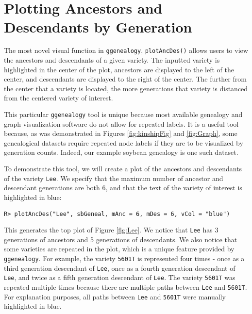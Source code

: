 \documentclass[11pt,a4paper,oldfontcommands,openany]{memoir}
\DeclareRobustCommand{\mybox}[2][gray!15]{%
\begin{tcolorbox}[   %
        breakable,
        left=0pt,
        right=0pt,
        top=0pt,
        bottom=0pt,
        colback=#1,
        colframe=#1,
        width=\dimexpr\textwidth\relax, 
        enlarge left by=0mm,
        boxsep=5pt,
        arc=0pt,outer arc=0pt,
        ]
        #2
\end{tcolorbox}
}
\numberwithin{equation}{section} %
\newcommand{\code}[1]{{\texttt{#1}}}
\newcommand{\pkg}[1]{{\texttt{#1}}}
\begin{document}
\section{Plotting Ancestors and Descendants by Generation}
\label{remedy}

The most novel visual function in \pkg{ggenealogy}, \code{plotAncDes()} allows users to view the ancestors and descendants of a given variety. The inputted variety is highlighted in the center of the plot, ancestors are displayed to the left of the center, and descendants are displayed to the right of the center. The further from the center that a variety is located, the more generations that variety is distanced from the centered variety of interest.

This particular \pkg{ggenealogy} tool is unique because most available genealogy and graph visualization software do not allow for repeated labels. It is a useful tool because, as was demonstrated in Figures \ref{fig:kinshipFig} and \ref{fig:Graph}, some genealogical datasets require repeated node labels if they are to be visualized by generation counts. Indeed, our example soybean genealogy is one such dataset.

To demonstrate this tool, we will create a plot of the ancestors and descendants of the variety \code{Lee}. We specify that the maximum number of ancestor and descendant generations are both 6, and that the text of the variety of interest is highlighted in blue:

\mybox{
\texttt{R> plotAncDes("Lee", sbGeneal, mAnc = 6, mDes = 6, vCol = "blue")}
}

This generates the top plot of Figure \ref{fig:Lee}. We notice that \code{Lee} has 3 generations of ancestors and 5 generations of descendants. We also notice that some varieties are repeated in the plot, which is a unique feature provided by \pkg{ggenealogy}. For example, the variety \code{5601T} is represented four times - once as a third generation descendant of \code{Lee}, once as a fourth generation descendant of \code{Lee}, and twice as a fifth generation descendant of \code{Lee}. The variety \code{5601T} was repeated multiple times because there are multiple paths between \code{Lee} and \code{5601T}. For explanation purposes, all paths between \code{Lee} and \code{5601T} were manually highlighted in blue.
\end{document}
